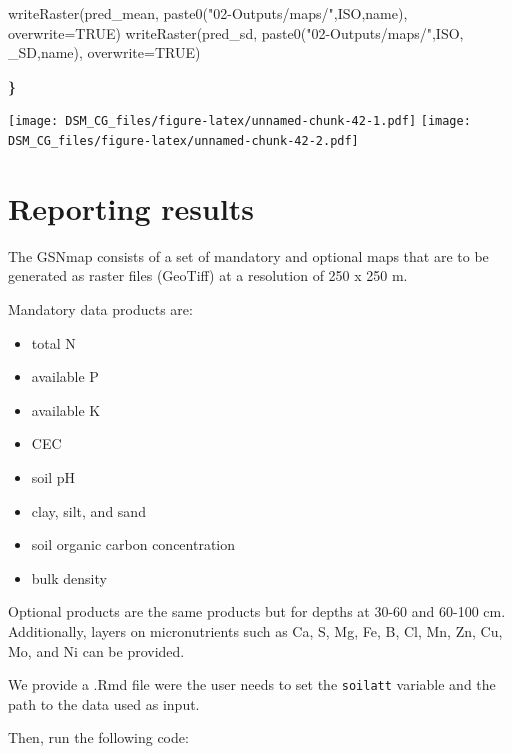 \documentclass[
  10pt,
  b5paper,
  oneside]{book}
\newenvironment{Shaded}{\begin{snugshade}}{\end{snugshade}}
\newcommand{\AttributeTok}[1]{\textcolor[rgb]{0.77,0.63,0.00}{#1}}
\newcommand{\ConstantTok}[1]{\textcolor[rgb]{0.00,0.00,0.00}{#1}}
\newcommand{\ErrorTok}[1]{\textcolor[rgb]{0.64,0.00,0.00}{\textbf{#1}}}
\newcommand{\FunctionTok}[1]{\textcolor[rgb]{0.00,0.00,0.00}{#1}}
\newcommand{\NormalTok}[1]{#1}
\newcommand{\StringTok}[1]{\textcolor[rgb]{0.31,0.60,0.02}{#1}}
\providecommand{\tightlist}{%
  \setlength{\itemsep}{0pt}\setlength{\parskip}{0pt}}
\begin{document}
\begin{Shaded}
\begin{Highlighting}[]
\FunctionTok{writeRaster}\NormalTok{(pred\_mean, }
            \FunctionTok{paste0}\NormalTok{(}\StringTok{"02{-}Outputs/maps/"}\NormalTok{,ISO,name),}
            \AttributeTok{overwrite=}\ConstantTok{TRUE}\NormalTok{)}
\FunctionTok{writeRaster}\NormalTok{(pred\_sd, }
            \FunctionTok{paste0}\NormalTok{(}\StringTok{"02{-}Outputs/maps/"}\NormalTok{,ISO, }\StringTok{\textquotesingle{}\_SD\textquotesingle{}}\NormalTok{,name),}
            \AttributeTok{overwrite=}\ConstantTok{TRUE}\NormalTok{)}



\ErrorTok{\}}
\end{Highlighting}
\end{Shaded}

\texttt{[image: DSM\_CG\_files/figure-latex/unnamed-chunk-42-1.pdf]} \texttt{[image: DSM\_CG\_files/figure-latex/unnamed-chunk-42-2.pdf]}

\hypertarget{reporting-results}{%
\chapter{Reporting results}\label{reporting-results}}

The GSNmap consists of a set of mandatory and optional maps that are to be generated as raster files (GeoTiff) at a resolution of 250 x 250 m.

Mandatory data products are:

\begin{itemize}
\tightlist
\item
  total N
\item
  available P
\item
  available K
\item
  CEC
\item
  soil pH
\item
  clay, silt, and sand
\item
  soil organic carbon concentration
\item
  bulk density
\end{itemize}

Optional products are the same products but for depths at 30-60 and 60-100 cm. Additionally, layers on micronutrients such as Ca, S, Mg, Fe, B, Cl, Mn, Zn, Cu, Mo, and Ni can be provided.

We provide a .Rmd file were the user needs to set the \texttt{soilatt} variable and the path to the data used as input.

Then, run the following code:
\end{document}
